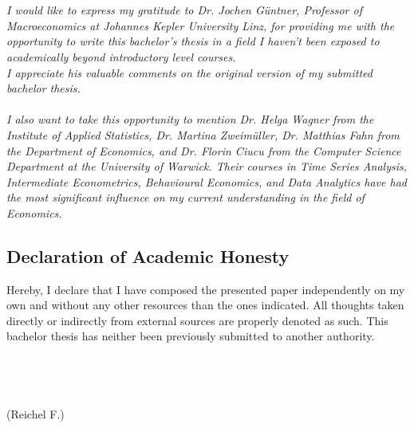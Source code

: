 

{%
	\chapter*{}

\textit{
I would like to express my gratitude to Dr. Jochen Güntner, Professor of Macroeconomics at Johannes Kepler University Linz, for providing me with the opportunity to write this bachelor's thesis in a field I haven't been exposed to academically beyond introductory level courses. \\
I appreciate his valuable comments on the original version of my submitted bachelor thesis.\\ \\
I also want to take this opportunity to mention Dr. Helga Wagner from the Institute of Applied Statistics, Dr. Martina Zweimüller, Dr. Matthias Fahn from the Department of Economics, and Dr. Florin Ciucu from the Computer Science Department at the University of Warwick. Their courses in Time Series Analysis, Intermediate Econometrics, Behavioural Economics, and Data Analytics have had the most significant influence on my current understanding in the field of Economics.
}

\newpage

\section*{Declaration of Academic Honesty}


Hereby, I declare that I have composed the presented paper independently on my own
and without any other resources than the ones indicated. All thoughts taken directly or
indirectly from external sources are properly denoted as such.
This bachelor thesis has neither been previously submitted to another authority.\\
\\ \\ \\ \\ 
(Reichel F.)



}
